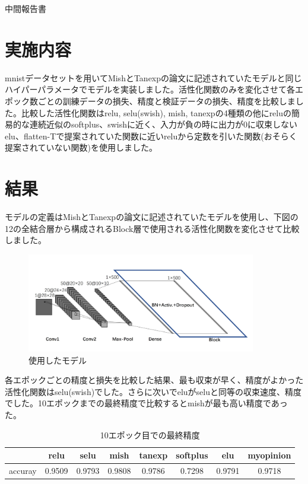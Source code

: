 \documentclass[12pt,a4j,draft]{jsarticle}
\begin{document}
\centerline{
\Large{中間報告書}
}


\section{実施内容}
mnistデータセットを用いてMishとTanexpの論文に記述されていたモデルと同じハイパーパラメータでモデルを実装しました。活性化関数のみを変化させて各エポック数ごとの訓練データの損失、精度と検証データの損失、精度を比較しました。比較した活性化関数はrelu, selu(swish), mish, tanexpの4種類の他にreluの簡易的な連続近似のsoftplus、swishに近く、入力が負の時に出力が0に収束しないelu、flatten-Tで提案されていた関数に近いreluから定数を引いた関数(おそらく提案されていない関数)を使用しました。

\section{結果}
モデルの定義はMishとTanexpの論文に記述されていたモデルを使用し、下図の12の全結合層から構成されるBlock層で使用される活性化関数を変化させて比較しました。

\begin{figure}[H]
  \begin{center}
    \includegraphics[width=10.0cm]{../image/model.png}
    \caption{使用したモデル}
    \label{model}
  \end{center}
\end{figure}

各エポックごとの精度と損失を比較した結果、最も収束が早く、精度がよかった活性化関数はselu(swish)でした。さらに次いでeluがseluと同等の収束速度、精度でした。10エポックまでの最終精度で比較するとmishが最も高い精度であった。
\begin{table}[H]
 \caption{10エポック目での最終精度}
 \label{10_acc}
 \centering
  \begin{tabular}{cccccccc}
   \hline
   &relu&selu&mish&tanexp&softplus&elu&myopinion \\
   \hline
   accuray&0.9509&0.9793&0.9808&0.9786&0.7298&0.9791&0.9718 \\
   \hline
  \end{tabular}
\end{table}
\end{document}
